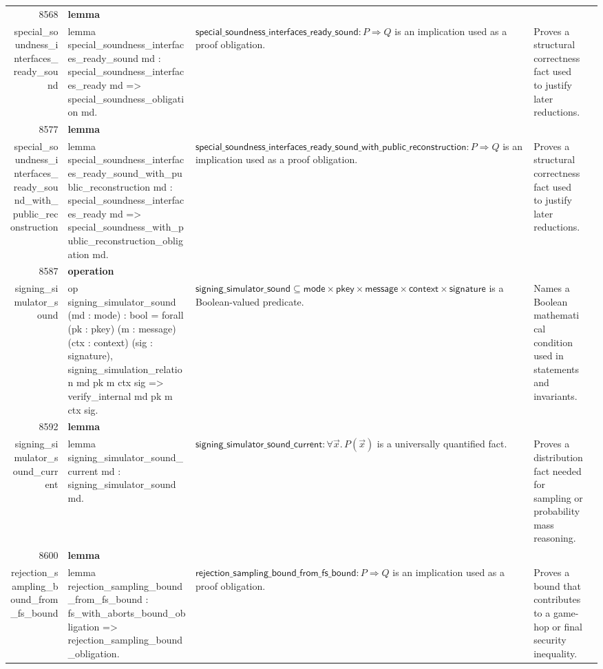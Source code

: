 \documentclass[10pt]{article}
\newcommand{\ec}[1]{\begingroup\ttfamily\scriptsize #1\endgroup}
\begin{document}
\begin{longtable}{r L{0.17\textwidth} L{0.26\textwidth} L{0.27\textwidth} L{0.20\textwidth}}
8568 & \textbf{lemma}\\\ec{special\_soundness\_interfaces\_ready\_sound} & \ec{lemma special\_soundness\_interfaces\_ready\_sound md : special\_soundness\_interfaces\_ready md => special\_soundness\_obligation md.} & \(\mathsf{special\_soundness\_interfaces\_ready\_sound} : P \Rightarrow Q\) is an implication used as a proof obligation. & Proves a structural correctness fact used to justify later reductions. \\
8577 & \textbf{lemma}\\\ec{special\_soundness\_interfaces\_ready\_sound\_with\_public\_reconstruction} & \ec{lemma special\_soundness\_interfaces\_ready\_sound\_with\_public\_reconstruction md : special\_soundness\_interfaces\_ready md => special\_soundness\_with\_public\_reconstruction\_obligation md.} & \(\mathsf{special\_soundness\_interfaces\_ready\_sound\_with\_public\_reconstruction} : P \Rightarrow Q\) is an implication used as a proof obligation. & Proves a structural correctness fact used to justify later reductions. \\
8587 & \textbf{operation}\\\ec{signing\_simulator\_sound} & \ec{op signing\_simulator\_sound (md : mode) : bool = forall (pk : pkey) (m : message) (ctx : context) (sig : signature), signing\_simulation\_relation md pk m ctx sig => verify\_internal md pk m ctx sig.} & \(\mathsf{signing\_simulator\_sound} \subseteq \mathsf{mode} \times \mathsf{pkey} \times \mathsf{message} \times \mathsf{context} \times \mathsf{signature}\) is a Boolean-valued predicate. & Names a Boolean mathematical condition used in statements and invariants. \\
8592 & \textbf{lemma}\\\ec{signing\_simulator\_sound\_current} & \ec{lemma signing\_simulator\_sound\_current md : signing\_simulator\_sound md.} & \(\mathsf{signing\_simulator\_sound\_current} : \forall \vec{x}.\, P(\vec{x})\) is a universally quantified fact. & Proves a distribution fact needed for sampling or probability mass reasoning. \\
8600 & \textbf{lemma}\\\ec{rejection\_sampling\_bound\_from\_fs\_bound} & \ec{lemma rejection\_sampling\_bound\_from\_fs\_bound : fs\_with\_aborts\_bound\_obligation => rejection\_sampling\_bound\_obligation.} & \(\mathsf{rejection\_sampling\_bound\_from\_fs\_bound} : P \Rightarrow Q\) is an implication used as a proof obligation. & Proves a bound that contributes to a game-hop or final security inequality. \\

\end{longtable}
\end{document}
